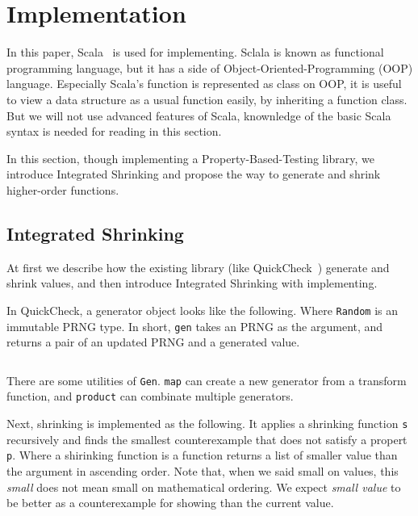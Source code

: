 \documentclass[a4paper,10pt]{article}
\theoremstyle{definition}
\begin{document}
\section{Implementation}

In this paper, Scala~\cite{scala_online} is used for implementing.
Sclala is known as functional programming language, but it has a side of Object-Oriented-Programming (OOP) language.
Especially Scala's function is represented as class on OOP, it is useful to view a data structure as a usual function easily, by inheriting a function class.
But we will not use advanced features of Scala, knownledge of the basic Scala syntax is needed for reading in this section.

In this section, though implementing a Property-Based-Testing library, we introduce Integrated Shrinking and propose the way to generate and shrink higher-order functions.

\subsection{Integrated Shrinking}\label{subsec:integrated-shrinking}

At first we describe how the existing library (like QuickCheck~\cite{claessen_quickcheck_2011}) generate and shrink values, and then introduce Integrated Shrinking with implementing.

In QuickCheck, a generator object looks like the following.
Where \texttt{Random} is an immutable PRNG type.
In short, \texttt{gen} takes an PRNG as the argument, and returns a pair of an updated PRNG and a generated value.

\inputminted[breaklines,firstline=31,lastline=35]{scala}{../src/main/scala/minicheck.scala}

There are some utilities of \texttt{Gen}.
\texttt{map} can create a new generator from a transform function, and \texttt{product} can combinate multiple generators.

Next, shrinking is implemented as the following.
It applies a shrinking function \texttt{s} recursively and finds the smallest counterexample that does not satisfy a propert \texttt{p}.
Where a shirinking function is a function returns a list of smaller value than the argument in ascending order.
Note that, when we said small on values, this \textit{small} does not mean small on mathematical ordering.
We expect \textit{small value} to be better as a counterexample for showing than the current value.

\inputminted[breaklines,firstline=37,lastline=38]{scala}{../src/main/scala/minicheck.scala}
\end{document}
